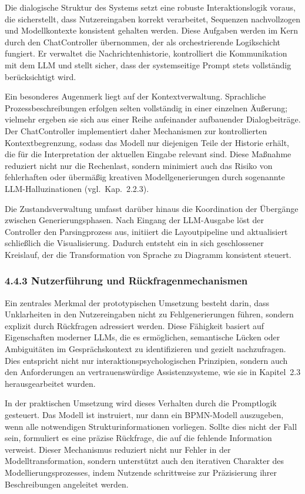 \documentclass[a4paper,12pt]{scrreprt}
\begin{document}
Die dialogische Struktur des Systems setzt eine robuste Interaktionslogik voraus, die sicherstellt, dass Nutzereingaben korrekt verarbeitet, Sequenzen nachvollzogen und Modellkontexte konsistent gehalten werden. Diese Aufgaben werden im Kern durch den ChatController übernommen, der als orchestrierende Logikschicht fungiert. Er verwaltet die Nachrichtenhistorie, kontrolliert die Kommunikation mit dem LLM und stellt sicher, dass der systemseitige Prompt stets vollständig berücksichtigt wird.

Ein besonderes Augenmerk liegt auf der Kontextverwaltung. Sprachliche Prozessbeschreibungen erfolgen selten vollständig in einer einzelnen Äußerung; vielmehr ergeben sie sich aus einer Reihe aufeinander aufbauender  Dialogbeiträge. Der ChatController implementiert daher Mechanismen zur kontrollierten Kontextbegrenzung, sodass das Modell nur diejenigen Teile der Historie erhält, die für die Interpretation der aktuellen Eingabe relevant sind. Diese Maßnahme reduziert nicht nur die Rechenlast, sondern minimiert auch das Risiko von fehlerhaften oder übermäßig kreativen Modellgenerierungen durch sogenannte LLM-Halluzinationen (vgl.~Kap.~2.2.3).

Die Zustandsverwaltung umfasst darüber hinaus die Koordination der Übergänge zwischen Generierungsphasen. Nach Eingang der LLM-Ausgabe löst der Controller den Parsingprozess aus, initiiert die Layoutpipeline und aktualisiert schließlich die Visualisierung. Dadurch entsteht ein in sich geschlossener Kreislauf, der die Transformation von Sprache zu Diagramm konsistent steuert.

\subsubsection*{4.4.3 Nutzerführung und Rückfragenmechanismen}

Ein zentrales Merkmal der prototypischen Umsetzung besteht darin, dass Unklarheiten in den Nutzereingaben nicht zu Fehlgenerierungen führen, sondern explizit durch Rückfragen adressiert werden. Diese Fähigkeit basiert auf Eigenschaften moderner LLMs, die es ermöglichen, semantische Lücken oder Ambiguitäten im Gesprächskontext zu identifizieren und gezielt nachzufragen. Dies entspricht nicht nur interaktionspsychologischen Prinzipien, sondern auch den Anforderungen an vertrauenswürdige Assistenzsysteme, wie sie in Kapitel~2.3 herausgearbeitet wurden.

In der praktischen Umsetzung wird dieses Verhalten durch die Promptlogik gesteuert. Das Modell ist instruiert, nur dann ein BPMN-Modell auszugeben, wenn alle notwendigen Strukturinformationen vorliegen. Sollte dies nicht der Fall sein, formuliert es eine präzise Rückfrage, die auf die fehlende Information verweist. Dieser Mechanismus reduziert nicht nur Fehler in der Modelltransformation, sondern unterstützt auch den iterativen Charakter des Modellierungsprozesses, indem Nutzende schrittweise zur Präzisierung ihrer Beschreibungen angeleitet werden.
\end{document}
